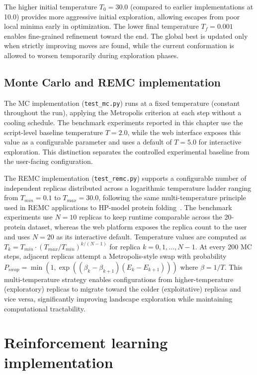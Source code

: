 The higher initial temperature $T_0 = 30.0$ (compared to earlier implementations at 10.0) provides more aggressive initial exploration, allowing escapes from poor local minima early in optimization. The lower final temperature $T_f = 0.001$ enables fine-grained refinement toward the end. The global best is updated only when strictly improving moves are found, while the current conformation is allowed to worsen temporarily during exploration phases.

\subsection{Monte Carlo and REMC implementation}
\label{cap4:subsec_remc_impl}

The MC implementation (\texttt{test\_mc.py}) runs at a fixed temperature (constant throughout the run), applying the Metropolis criterion at each step without a cooling schedule. The benchmark experiments reported in this chapter use the script-level baseline temperature $T = 2.0$, while the web interface exposes this value as a configurable parameter and uses a default of $T = 5.0$ for interactive exploration. This distinction separates the controlled experimental baseline from the user-facing configuration.

The REMC implementation (\texttt{test\_remc.py}) supports a configurable number of independent replicas distributed across a logarithmic temperature ladder ranging from $T_{min} = 0.1$ to $T_{max} = 30.0$, following the same multi-temperature principle used in REMC applications to HP-model protein folding~\cite{thachuk2007replica}. The benchmark experiments use $N = 10$ replicas to keep runtime comparable across the 20-protein dataset, whereas the web platform exposes the replica count to the user and uses $N = 20$ as its interactive default. Temperature values are computed as $T_k = T_{min} \cdot (T_{max}/T_{min})^{k/(N-1)}$ for replica $k = 0, 1, \ldots, N-1$. At every 200 MC steps, adjacent replicas attempt a Metropolis-style swap with probability $P_{swap} = \min(1, \exp((\beta_k - \beta_{k+1})(E_k - E_{k+1})))$ where $\beta = 1/T$. This multi-temperature strategy enables configurations from higher-temperature (exploratory) replicas to migrate toward the colder (exploitative) replicas and vice versa, significantly improving landscape exploration while maintaining computational tractability.

\section{Reinforcement learning implementation}
\label{cap4:sec_rl_implementation}

